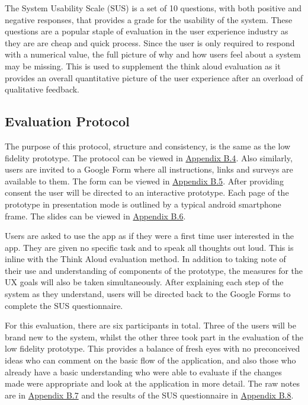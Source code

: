 \documentclass[a4 paper, 12pt]{article}
\begin{document}
    The System Usability Scale (SUS) is a set of 10 questions, with both positive and negative responses, that provides a grade for the usability of the system. These questions are a popular staple of evaluation in the user experience industry as they are are cheap and quick process. Since the user is only required to respond with a numerical value, the full picture of why and how users feel about a system may be missing. This is used to supplement the think aloud evaluation as it provides an overall quantitative picture of the user experience after an overload of qualitative feedback.

    \subsection{Evaluation Protocol}
    The purpose of this protocol, structure and consistency, is the same as the low fidelity prototype. The protocol can be viewed in \hyperref[sec:B.4]{Appendix B.4}. Also similarly, users are invited to a Google Form where all instructions, links and surveys are available to them. The form can be viewed in \hyperref[sec:B.5]{Appendix B.5}. After providing consent the user will be directed to an interactive prototype. Each page of the prototype in presentation mode is outlined by a typical android smartphone frame. The slides can be viewed in \hyperref[sec:B.1]{Appendix B.6}. 

    Users are asked to use the app as if they were a first time user interested in the app. They are given no specific task and to speak all thoughts out loud. This is inline with the Think Aloud evaluation method. In addition to taking note of their use and understanding of components of the prototype, the measures for the UX goals will also be taken simultaneously. After explaining each step of the system as they understand, users will be directed back to the Google Forms to complete the SUS questionnaire. 

    For this evaluation, there are six participants in total. Three of the users will be brand new to the system, whilst the other three took part in the evaluation of the low fidelity prototype. This provides a balance of fresh eyes with no preconceived ideas who can comment on the basic flow of the application, and also those who already have a basic understanding who were able to evaluate if the changes made were appropriate and look at the application in more detail. The raw notes are in \hyperref[sec:B.7]{Appendix B.7} and the results of the SUS questionnaire in \hyperref[sec:B.8]{Appendix B.8}.
\end{document}
